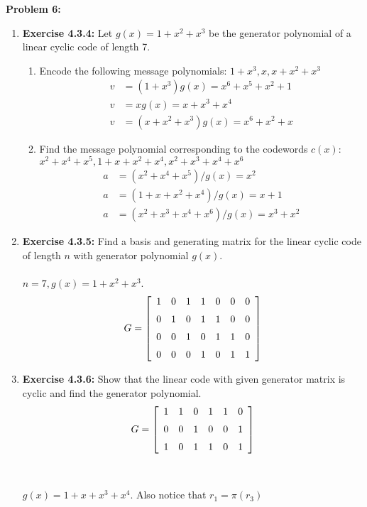 \documentclass[11pt]{article}
\newcommand{\spacer}{\noalign{\medskip}}
\newenvironment{problem}[1]{\textbf{Problem #1: }}{\newpage}
\begin{document}
	\begin{problem}{6}
		\begin{enumerate}[label = (\alph*)]
			\item \textbf{Exercise 4.3.4: } Let $g(x) = 1 + x^2 + x^3$ be the generator polynomial of a linear cyclic code of length 7.
			\begin{enumerate}[label = (\alph*)]
				\item Encode the following message polynomials: $1 + x^3, x, x + x^2 + x^3$
				\begin{align*}
					v &= (1 + x^3)g(x) = x^6 + x^5  +x^2 + 1 \\
					v &= xg(x) = x + x^3 + x^4 \\
					v &= (x + x^2 + x^3)g(x) = x^6 + x^2 + x
				\end{align*}
				\item Find the message polynomial corresponding to the codewords $c(x)$: $x^2 + x^4+ x^5, 1 + x + x^2 + x^4, x^2 + x^3 + x^4 + x^6$
				\begin{align*}
					a &= (x^2 + x^4+ x^5 )/g(x) = x^2 \\
					a &= ( 1 + x + x^2 + x^4) / g(x) = x+1 \\
					a &= (x^2 + x^3 + x^4 + x^6) / g(x) = x^3 + x^2
				\end{align*}
			\end{enumerate}
			\item \textbf{Exercise 4.3.5: } Find a  basis and generating matrix for the linear cyclic code of length $n$ with generator polynomial $g(x)$.
			\\ \\
			$n = 7, g(x) = 1 + x^2 + x^3$.
			\[G = \left[\begin{array}{ccccccc}
				1 & 0 & 1 & 1 & 0 & 0 & 0 \\
				\spacer 0 & 1 & 0 & 1 & 1 & 0 & 0 \\
				\spacer 0 & 0 & 1 & 0 & 1 & 1 & 0 \\
				\spacer 0 & 0 & 0 & 1 & 0 & 1 & 1 \\
			\end{array}\right]\]
			\item \textbf{Exercise 4.3.6: } Show that the linear code with given generator matrix is cyclic and find the generator polynomial.
			\[G = \left[\begin{array}{cccccc}
				1 & 1 & 0 & 1 & 1 & 0 \\
				\spacer 0 & 0 & 1 & 0 & 0 & 1 \\
				\spacer 1 & 0 & 1 & 1 & 0 & 1
			\end{array}\right]\]
			\\ \\
			$g(x) = 1 + x + x^3 + x^4$.  Also notice that $r_1 = \pi(r_3)$
		\end{enumerate}
	\end{problem}
\end{document}
